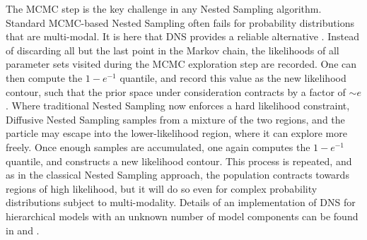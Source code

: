 \documentclass[12pt]{emulateapj}
\begin{document}
The MCMC step is the key challenge in any Nested Sampling algorithm. Standard MCMC-based Nested Sampling often fails for probability distributions that
are multi-modal. It is here that DNS provides a reliable alternative \citep[for details, see][]{brewer2011}. Instead of discarding all but the last point in the Markov chain, the likelihoods of all parameter sets visited during the MCMC exploration step
 are recorded. One can then compute the $1-e^{-1}$ quantile, and record this value as the new likelihood contour, such that the prior space
 under consideration contracts by a factor of $\sim\!\! e$. Where traditional Nested Sampling now enforces a hard likelihood constraint, Diffusive Nested Sampling samples from a mixture of the 
 two regions, and the particle may escape into the lower-likelihood region, where it can explore more freely. Once enough samples are accumulated,
 one again computes the $1-e^{-1}$ quantile, and constructs a new likelihood contour. This process is repeated, and as in the classical Nested Sampling
 approach, the population contracts towards regions of high likelihood, but it will do so even for complex probability distributions subject to multi-modality.
 Details of an implementation of DNS for hierarchical models with an unknown number of model components can be found in \citet{brewer2013} and \citet{brewer2014}.
 
\end{document}
